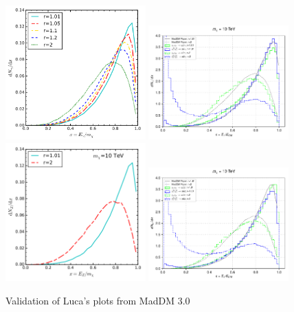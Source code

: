\documentclass[epj,nopacs,fleqn]{svjour}
\begin{document}
\begin{figure}[!h]
	\centering
		\subfigure
	{ \includegraphics[width=0.48\textwidth]{Fig/Validation_1009/lucaa.png} } 
		\subfigure
	{\includegraphics[width=0.48\textwidth]{Fig/Validation_1009/Luca_a.pdf} }
		\subfigure
	{\includegraphics[width=0.48\textwidth]{Fig/Validation_1009/lucaz.png} }
		\subfigure
	{\includegraphics[width=0.48\textwidth]{Fig/Validation_1009/Luca_z.pdf} }
	\caption{Validation of Luca's plots from MadDM 3.0}
		
		
\end{figure}
\end{document}
